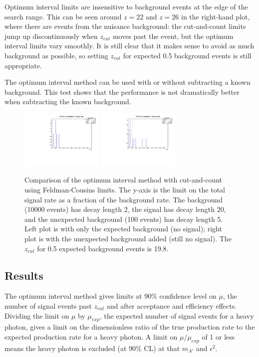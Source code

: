 Optimum interval limits are insensitive to background events at the edge of the search range.
This can be seen around $z=22$ and $z=26$ in the right-hand plot, where there are events from the nuisance background: the cut-and-count limits jump up discontinuously when $z_{cut}$ moves past the event, but the optimum interval limits vary smoothly.
It is still clear that it makes sense to avoid as much background as possible, so setting $z_{cut}$ for expected 0.5 background events is still appropriate.

The optimum interval method can be used with or without subtracting a known background.
This test shows that the performance is not dramatically better when subtracting the known background.

\begin{figure}[ht]
\begin{center}
    \includegraphics[width=0.35\textwidth,page=5,angle=-90]{vertexing/figs/toy_nothing}
    \includegraphics[width=0.35\textwidth,page=5,angle=-90]{vertexing/figs/toy_nosignal}
\end{center}
    \caption{Comparison of the optimum interval method with cut-and-count using Feldman-Cousins limits. The y-axis is the limit on the total signal rate as a fraction of the background rate. 
        The background (10000 events) has decay length 2, the signal has decay length 20, and the unexpected background (100 events) has decay length 5. Left plot is with only the expected background (no signal); right plot is with the unexpected background added (still no signal). The $z_{cut}$ for 0.5 expected background events is 19.8.}
    \label{fig:optimum_interval_demo}
\end{figure}

\subsection{Results}
\label{sec:results}
The optimum interval method gives limits at 90\% confidence level on $\mu$, the number of signal events past $z_{cut}$ and after acceptance and efficiency effects.
Dividing the limit on $\mu$ by $\mu_{exp}$, the expected number of signal events for a heavy photon, gives a limit on the dimensionless ratio of the true production rate to the expected production rate for a heavy photon.
A limit on $\mu/\mu_{exp}$ of 1 or less means the heavy photon is excluded (at 90\% CL) at that $m_{A'}$ and $\epsilon^2$.

